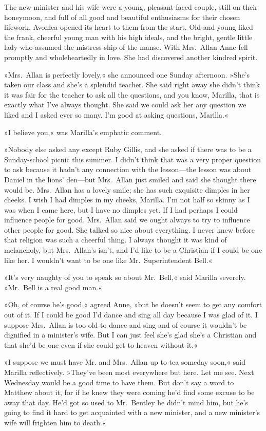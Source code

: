 The new minister and his wife were a young, pleasant-faced couple, still on their honeymoon, and full of all good and beautiful enthusiasms for their chosen lifework. Avonlea opened its heart to them from the start. Old and young liked the frank, cheerful young man with his high ideals, and the bright, gentle little lady who assumed the mistress-ship of the manse. With Mrs.~Allan Anne fell promptly and wholeheartedly in love. She had discovered another kindred spirit.

»Mrs.~Allan is perfectly lovely,« she announced one Sunday afternoon. »She's taken our class and she's a splendid teacher. She said right away she didn't think it was fair for the teacher to ask all the questions, and you know, Marilla, that is exactly what I've always thought. She said we could ask her any question we liked and I asked ever so many. I'm good at asking questions, Marilla.«

»I believe you,« was Marilla's emphatic comment.

»Nobody else asked any except Ruby Gillis, and she asked if there was to be a Sunday-school picnic this summer. I didn't think that was a very proper question to ask because it hadn't any connection with the lesson—the lesson was about Daniel in the lions' den—but Mrs.~Allan just smiled and said she thought there would be. Mrs.~Allan has a lovely smile; she has such exquisite dimples in her cheeks. I wish I had dimples in my cheeks, Marilla. I'm not half so skinny as I was when I came here, but I have no dimples yet. If I had perhaps I could influence people for good. Mrs.~Allan said we ought always to try to influence other people for good. She talked so nice about everything. I never knew before that religion was such a cheerful thing. I always thought it was kind of melancholy, but Mrs.~Allan's isn't, and I'd like to be a Christian if I could be one like her. I wouldn't want to be one like Mr.~Superintendent Bell.«

»It's very naughty of you to speak so about Mr.~Bell,« said Marilla severely. »Mr.~Bell is a real good man.«

»Oh, of course he's good,« agreed Anne, »but he doesn't seem to get any comfort out of it. If I could be good I'd dance and sing all day because I was glad of it. I suppose Mrs.~Allan is too old to dance and sing and of course it wouldn't be dignified in a minister's wife. But I can just feel she's glad she's a Christian and that she'd be one even if she could get to heaven without it.«

»I suppose we must have Mr. and Mrs.~Allan up to tea someday soon,« said Marilla reflectively. »They've been most everywhere but here. Let me see. Next Wednesday would be a good time to have them. But don't say a word to Matthew about it, for if he knew they were coming he'd find some excuse to be away that day. He'd got so used to Mr.~Bentley he didn't mind him, but he's going to find it hard to get acquainted with a new minister, and a new minister's wife will frighten him to death.«

